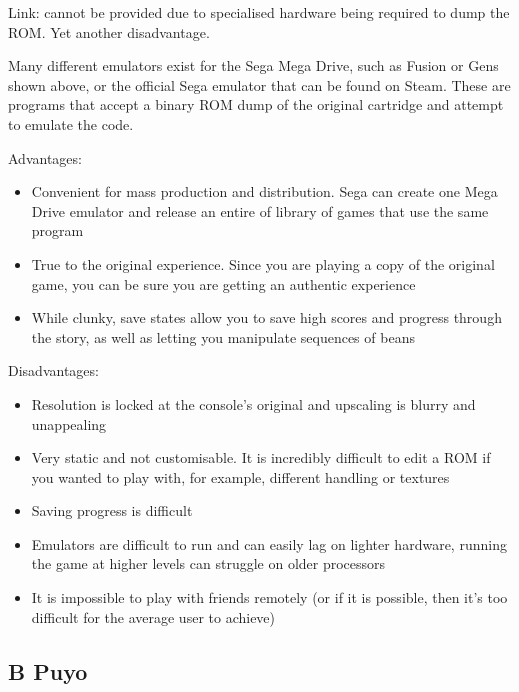 \documentclass{report}
\begin{document}
Link: cannot be provided due to specialised hardware being required to dump the ROM. Yet another disadvantage.

Many different emulators exist for the Sega Mega Drive, such as Fusion or Gens shown above, or the official Sega emulator that can be found on Steam. These are programs that accept a binary ROM dump of the original cartridge and attempt to emulate the code.
\vspace{0.3cm}

Advantages:

\begin{itemize}
    \renewcommand\labelitemi{--}
    \item Convenient for mass production and distribution.
    Sega can create one Mega Drive emulator and release an entire of library of games that use the same program
    \item True to the original experience.
    Since you are playing a copy of the original game, you can be sure you are getting an authentic experience
    \item While clunky, save states allow you to save high scores and progress through the story, as well as letting you manipulate sequences of beans
\end{itemize}

Disadvantages: 

\begin{itemize}
    \renewcommand\labelitemi{--}
    \item Resolution is locked at the console’s original and upscaling is blurry and unappealing
    \item Very static and not customisable. It is incredibly difficult to edit a ROM if you wanted to play with, for example, different handling or textures
    \item Saving progress is difficult
    \item Emulators are difficult to run and can easily lag on lighter hardware, running the game at higher levels can struggle on older processors
    \item It is impossible to play with friends remotely (or if it is possible, then it’s too difficult for the average user to achieve)
\end{itemize}

\subsection{B Puyo}
\end{document}
